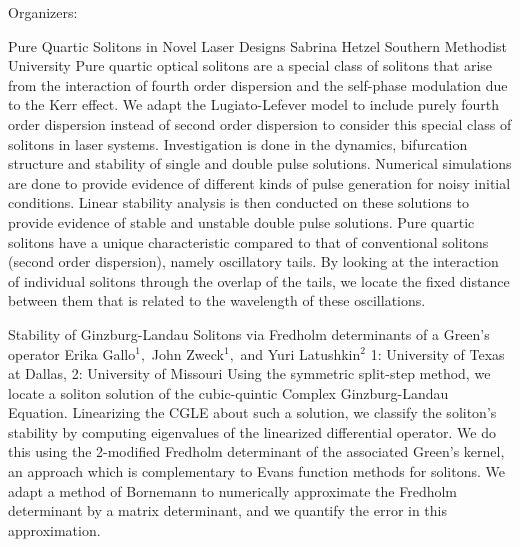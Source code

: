 \label{mini22}

\miniabs
{}
{Organizers: }
{}

\vspace{2ex}
\abs
{Pure Quartic Solitons in Novel Laser Designs}
{Sabrina Hetzel}
{Southern Methodist University}
{Pure quartic optical solitons are a special class of solitons that arise from the interaction of fourth order dispersion and the self-phase modulation due to the Kerr effect. We adapt the Lugiato-Lefever model to include purely fourth order dispersion instead of second order dispersion to consider this special class of solitons in laser systems. Investigation is done in the dynamics, bifurcation structure and stability of single and double pulse solutions. Numerical simulations are done to provide evidence of different kinds of pulse generation for noisy initial conditions. Linear stability analysis is then conducted on these solutions to provide evidence of stable and unstable double pulse solutions. Pure quartic solitons have a unique characteristic compared to that of conventional solitons (second order dispersion), namely oscillatory tails. By looking at the interaction of individual solitons through the overlap of the tails, we locate the fixed distance between them that is related to the wavelength of these oscillations.}


\vspace{1.5ex}
\abs
{Stability of {G}inzburg-{L}andau Solitons via {F}redholm determinants of a {G}reen's operator} 
{Erika Gallo$^{1},$ John Zweck$^{1},$ and Yuri Latushkin$^{2}$}
{1: University of Texas at Dallas, 2: University of Missouri} 
{Using the symmetric split-step method, we locate a soliton solution of the cubic-quintic Complex {G}inzburg-{L}andau Equation. Linearizing the {CGLE} about such a solution,  we classify the soliton’s stability by computing eigenvalues of the linearized differential operator. We do this using the 2-modified {F}redholm determinant of the associated {G}reen’s kernel, an approach which is complementary to {E}vans function methods for solitons. We adapt a method of {B}ornemann to numerically approximate the {F}redholm determinant by a matrix determinant, and we quantify the error in this approximation.}


